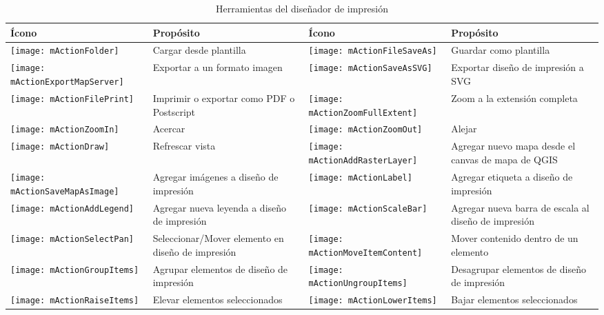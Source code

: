 \begin{table}[h]
\centering
\caption{Herramientas del diseñador de impresión}\label{tab:printcomposer_tools}\medskip
 \begin{tabular}{|l|p{6.9cm}|l|p{6.9cm}|}
 \hline \textbf{Ícono} & \textbf{Propósito} & \textbf{Ícono} &
 \textbf{Propósito} \\
 \hline \texttt{[image: mActionFolder]}
 & Cargar desde plantilla &
 \texttt{[image: mActionFileSaveAs]} & Guardar como plantilla \\
 \hline \texttt{[image: mActionExportMapServer]}
 & Exportar a un formato imagen & 
 \texttt{[image: mActionSaveAsSVG]} & Exportar diseño de impresión 
 a SVG \\
 \hline \texttt{[image: mActionFilePrint]} & Imprimir o 
 exportar como PDF o Postscript &
 \texttt{[image: mActionZoomFullExtent]} & Zoom a
 la extensión completa \\
 \hline \texttt{[image: mActionZoomIn]} & Acercar &
 \texttt{[image: mActionZoomOut]} & Alejar \\
 \hline \texttt{[image: mActionDraw]} & Refrescar 
 vista &
 \texttt{[image: mActionAddRasterLayer]} & Agregar 
 nuevo mapa desde el canvas de mapa de QGIS  \\
 \hline \texttt{[image: mActionSaveMapAsImage]} & Agregar imágenes a  
 diseño de impresión &
 \texttt{[image: mActionLabel]} & Agregar etiqueta a diseño de impresión \\
 \hline \texttt{[image: mActionAddLegend]} & Agregar nueva leyenda a 
 diseño de impresión & 
 \texttt{[image: mActionScaleBar]} & Agregar nueva barra de escala al diseño de impresión \\
 \hline \texttt{[image: mActionSelectPan]} & Seleccionar/Mover elemento en 
 diseño de impresión &
 \texttt{[image: mActionMoveItemContent]} & Mover contenido dentro
 de un elemento \\
 \hline \texttt{[image: mActionGroupItems]} & Agrupar elementos de diseño 
 de impresión & 
 \texttt{[image: mActionUngroupItems]} & Desagrupar elementos de diseño 
 de impresión \\
 \hline \texttt{[image: mActionRaiseItems]} & Elevar elementos
 seleccionados  &
 \texttt{[image: mActionLowerItems]} & Bajar elementos seleccionados \\

\end{tabular}
\end{table}
